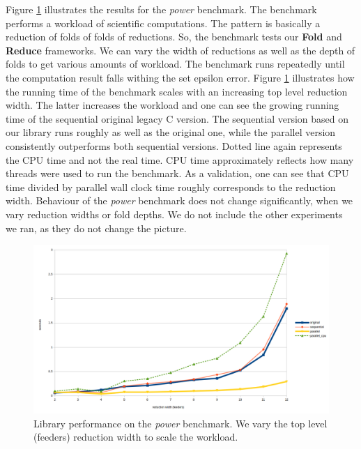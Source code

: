 \quad Figure \ref{fig:performance_power_reduction_width} illustrates the results for the \textit{power} benchmark. The benchmark performs a workload of scientific computations. The pattern is basically a reduction of folds of folds of reductions. So, the benchmark tests our \textbf{Fold} and \textbf{Reduce} frameworks. We can vary the width of reductions as well as the depth of folds to get various amounts of workload. The benchmark runs repeatedly until the computation result falls withing the set epsilon error. Figure \ref{fig:performance_power_reduction_width} illustrates how the running time of the benchmark scales with an increasing top level reduction width. The latter increases the workload and one can see the growing running time of the sequential original legacy C version. The sequential version based on our library runs roughly as well as the original one, while the parallel version consistently outperforms both sequential versions. Dotted line again represents the CPU time and not the real time. CPU time approximately reflects how many threads were used to run the benchmark. As a validation, one can see that CPU time divided by parallel wall clock time roughly corresponds to the reduction width. Behaviour of the \textit{power} benchmark does not change significantly, when we vary reduction widths or fold depths. We do not include the other experiments we ran, as they do not change the picture.
\begin{figure}[!htb]
\includegraphics[width=1.0\textwidth]{images/power_reduction_width.png}
\caption{Library performance on the \textit{power} benchmark. We vary the top level (feeders) reduction width to scale the workload.}
\label{fig:performance_power_reduction_width}
\end{figure}\newline\null
